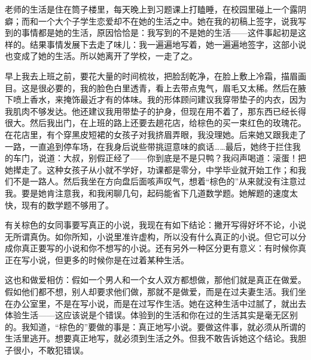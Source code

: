 老师的生活是住在筒子楼里，每天晚上到习题课上打瞌睡，在校园里碰上一个露阴癖；而和一个大个子学生恋爱却不在她的生活之中。她在我的初稿上签字，说我写到的事情都是她的生活，原因恰恰是：我写到的不是她的生活——这件事起初是这样的。结果事情发展下去走了味儿：我一遍遍地写着，她一遍遍地签字，这部小说也变成了她的生活。所以她离开了学校，一走了之。 

早上我去上班之前，要花大量的时间梳妆，把脸刮乾净，在脸上敷上冷霜，描眉画目。这是很必要的，我的脸色白里透青，看上去带点鬼气，眉毛又太稀。然后在腋下喷上香水，来掩饰最近才有的体味。我的形体顾问建议我穿带垫子的内衣，因为我肌肉不够发达。他还建议我用带垫子的护身，但现在用不着了，那东西已经长得很大。然后我出门，在上班的路上还要去趟花店，给棕色的买一束红色的玫瑰花。在花店里，有个穿黑皮短裙的女孩子对我挤眉弄眼，我没理她。后来她又跟我走了一路，一直追到停车场，在我身后说些带挑逗意味的疯话……最后，她终于拦住我的车门，说道：大叔，别假正经了——你到底是不是只鸭？我闷声喝道：滚蛋！把她撵走了。这种女孩子从小就不学好，功课都是零分，中学毕业就开始工作；和我们不是一路人。然后我坐在方向盘后面咳声叹气，想着“棕色的”从来就没有注意过我。要是她肯注意我，和我闲聊几句，起码能省下几道数学题。她解题的速度太快，现有的数学题不够用了。 

有关棕色的女同事要写真正的小说，我现在有如下结论：撇开写得好坏不论，小说无所谓真伪。如你所知，小说里准许虚构，所以没有什么真正的小说。但它可以分成你真正要写的小说和你不想写的小说。还有另外一种区分更有意义：有时候你真正在写小说，但更多的时候你是在过着某种生活。 

这也和做爱相仿：假如一个男人和一个女人双方都想做，那他们就是真正在做爱。假如他们都不想，别人却要求他们做，那就不是做爱，而是在过夫妻生活。我们坐在办公室里，不是在写小说，而是在过写作生活。她在这种生活中过腻了，就出去体验生活——这应该说是个错误。体验到的生活和你在过的生活其实是毫无区别的。我知道，“棕色的”要做的事是：真正地写小说。要做这件事，就必须从所谓的生活里逃开。想要真正地写，就必须到生活之外。但我不敢告诉她这个结论。我胆子很小，不敢犯错误。 

